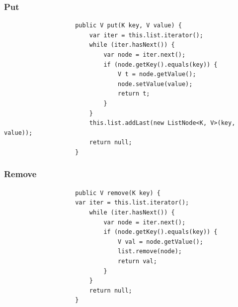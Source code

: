 \documentclass[a4paper, landscape, 8pt]{scrartcl}
\begin{document}
\begin{multicols*}{4}
                \subsubsection{Put}
                    \begin{lstlisting}
                    public V put(K key, V value) {
                        var iter = this.list.iterator();
                        while (iter.hasNext()) {
                            var node = iter.next();
                            if (node.getKey().equals(key)) {
                                V t = node.getValue();
                                node.setValue(value);
                                return t;
                            }
                        }
                        this.list.addLast(new ListNode<K, V>(key, value));
                        return null;
                    }
                    \end{lstlisting}

                \subsubsection{Remove}
                    \begin{lstlisting}
                    public V remove(K key) {
                    var iter = this.list.iterator();
                        while (iter.hasNext()) {
                            var node = iter.next();
                            if (node.getKey().equals(key)) {
                                V val = node.getValue();
                                list.remove(node);
                                return val;
                            }
                        }
                        return null;
                    }
                    \end{lstlisting}


\end{multicols*}
\end{document}
